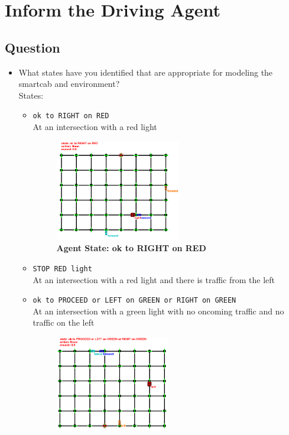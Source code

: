 \documentclass[twoside,openright,titlepage,numbers=noenddot,headinclude,%
               footinclude=true,cleardoublepage=empty,abstractoff,BCOR=5mm,%
               paper=a4,fontsize=11pt,ngerman,american]{scrreprt}
\numberwithin{theorem}{chapter}
\numberwithin{definition}{chapter}
\numberwithin{algorithm}{chapter}
\numberwithin{figure}{chapter}
\numberwithin{table}{chapter}
\numberwithin{equation}{chapter}
\begin{document}
\chapter*{Inform the Driving Agent}

\section*{Question}


\begin{itemize}
    \item What states have you identified that are appropriate for modeling the smartcab and environment?\\
States: 
  \begin{itemize}
    \item \texttt{ok to RIGHT on RED} \\ At an intersection with a red light
    \begin{figure}[!hbtp]
    \centering
    \includegraphics[width=0.55\textwidth]{figures/oktoRIGHTonRED}
  
    \caption{\textbf{Agent State: ok to RIGHT on RED}}\label{fig:state1}
    \end{figure}
    

    \item \texttt{STOP RED light} \\ At an intersection with a red light and there is traffic from the left
    
    \item \texttt{ok to PROCEED or LEFT on GREEN or RIGHT on GREEN} \\ At an intersection with a green light with no oncoming traffic and no traffic on the left
    \begin{figure}[!hbtp]
    \centering
    \includegraphics[width=0.5\textwidth]{figures/oktoPROCEEDorLEFTonGREEN}
  

\end{figure}
\end{itemize}
\end{itemize}
\end{document}
